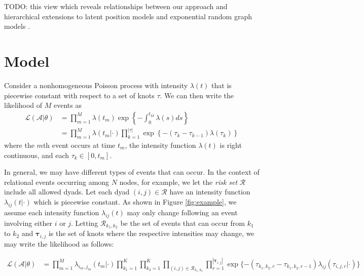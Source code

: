 \documentclass[11pt]{article}
\begin{document}
TODO: this view which reveals relationships between our approach and hierarchical extensions to latent position models \cite{Handcock2007} and exponential random graph models \cite{Schweinberger2011}.

\section{Model}

Consider a nonhomogeneous Poisson process with  intensity $\lambda(t)$ that is piecewise constant with respect to a set of knots $\tau$.  We can then write the likelihood of $M$ events as
\begin{align}
\mathcal{L}(\mathcal{A}|\theta) &= \prod_{m=1}^M \lambda(t_m) \exp\left\{ - \int_{0}^{t_M} \lambda(s)ds \right\} \\
&= \prod_{m=1}^M \lambda(t_m|\cdot) \prod_{k=1}^{|\tau|} \exp\left\{ - (\tau_{k} - \tau_{k-1}) \lambda(\tau_k) \right\}
\end{align}
\noindent where the $m$th event occurs at time $t_m$, the intensity function $\lambda(t)$ is right continuous, and each $\tau_k \in [0,t_m]$.

In general, we may have different types of events that can occur.   In the context of relational events occurring among $N$ nodes, for example, we let the \emph{risk set} $\mathcal{R}$ include all allowed dyads.  Let each dyad $(i,j) \in \mathcal{R}$ have an intensity function $\lambda_{ij}(t|\cdot)$ which is piecewise constant.  As shown in Figure \ref{fig:example}, we assume each intensity function $\lambda_{ij}(t)$ may only change following an event involving either $i$ or $j$.  Letting $ \mathcal{R}_{k_1,k_2}$ be the set of events that can occur from $k_1$ to $k_2$ and  $\boldsymbol{\tau}_{i,j}$ is the set of knots where the respective intensities may change, we may write the likelihood as follows:

\begin{align}
\mathcal{L}(\mathcal{A}|\theta) %
&= \prod_{m=1}^M \lambda_{i_m,j_m}(t_m|\cdot) \prod_{k_1=1}^K \prod_{k_2=1}^K \prod_{(i,j) \in \mathcal{R}_{k_1,k_2}} \prod_{r=1}^{|\boldsymbol{\tau}_{i,j}|} \exp\{ - (\tau_{k_1,k_2,r} - \tau_{k_1,k_2,r-1}) \lambda_{ij}(\tau_{i,j,r} | \cdot) \} \\
\end{align}
\end{document}
